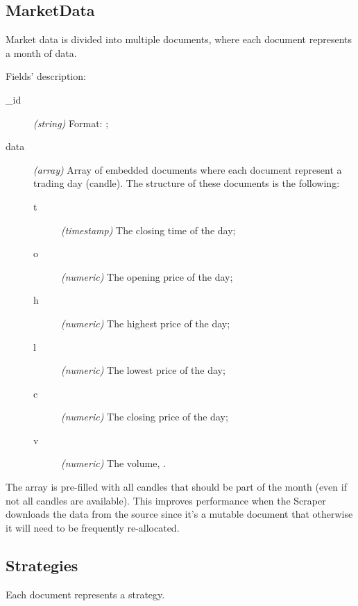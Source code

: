 \subsection{MarketData}



Market data is divided into multiple documents, where each document represents a
month of data.

Fields' description:
\begin{description}
	\item[\_id] \textit{(string)} Format:
		;
	\item[data] \textit{(array)} Array of embedded documents where each
		document represent a trading day (candle). The structure of
		these documents is the following:
		\begin{description}
			\item[t] \textit{(timestamp)} The closing time of the
				day;
			\item[o] \textit{(numeric)} The opening price of the
				day;
			\item[h] \textit{(numeric)} The highest price of the
				day;
			\item[l] \textit{(numeric)} The lowest price of the day;
			\item[c] \textit{(numeric)} The closing price of the
				day;
			\item[v] \textit{(numeric)} The volume, .
		\end{description}
\end{description}

The  array is pre-filled with all candles that should be part of the
month (even if not all candles are available). This improves performance when
the Scraper downloads the data from the source since it's a mutable document
that otherwise it will need to be frequently re-allocated.

\subsection{Strategies}



Each document represents a strategy.

